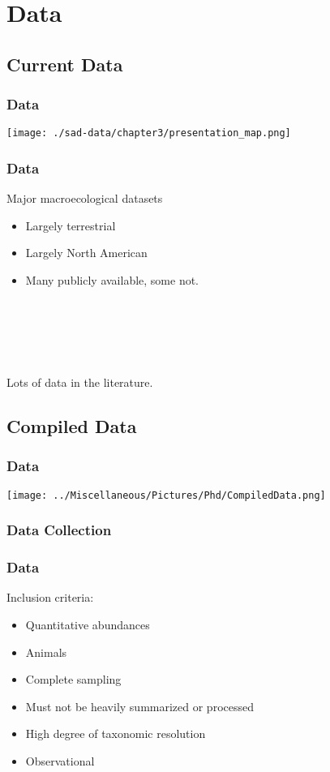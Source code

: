 \documentclass[14pt]{beamer}
\begin{document}
\section{Data}
\subsection{Current Data}
\begin{frame}[t]
\frametitle{Data}
\vspace{-7pt}
\texttt{[image: ./sad-data/chapter3/presentation\_map.png]}
\end{frame}

\begin{frame}[t]{}
\frametitle{Data}
\begin{large}
Major macroecological datasets\\
\end{large}
\begin{itemize}
\item Largely terrestrial
\item Largely North American
\item Many publicly available, some not.
\end{itemize}
~\\
~\\
~\\
~\\
\begin{large}
Lots of data in the literature.\\
\end{large}
\end{frame}


\subsection{Compiled Data}
\begin{frame}{}
\frametitle{Data}
\texttt{[image: ../Miscellaneous/Pictures/Phd/CompiledData.png]}
\end{frame}

\subsubsection{Data Collection}
\begin{frame}[t]{}
\frametitle{Data}
Inclusion criteria:
\begin{itemize}
\item Quantitative abundances
\item Animals
\item Complete sampling
\item Must not be heavily summarized or processed
\item High degree of taxonomic resolution
\item Observational
\end{itemize}
\end{frame}
\end{document}
